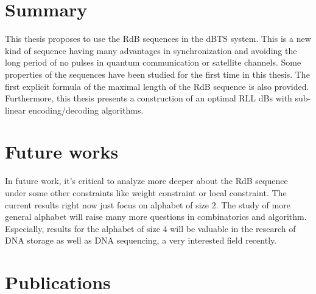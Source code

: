 \section*{Summary}
This thesis proposes to use the RdB sequences in the \gls{dBTS} system. This is a new kind of sequence having many advantages in synchronization and avoiding the long period of no pulses in quantum communication or satellite channels. Some properties of the sequences have been studied for the first time in this thesis. The first explicit formula of the maximal length of the \gls{RdB} sequence is also provided. Furthermore, this thesis presents a construction of an optimal RLL dBs with sub-linear encoding/decoding algorithms. 

\section*{Future works}
In future work, it's critical to analyze more deeper about the RdB sequence under some other constraints like weight constraint or local constraint. The current results right now just focus on alphabet of size $2$. The study of more general alphabet will raise many more questions in combinatorics and algorithm. Especially, results for the alphabet of size $4$ will be valuable in the research of DNA storage as well as DNA sequencing, a very interested field recently.

\section*{Publications}



